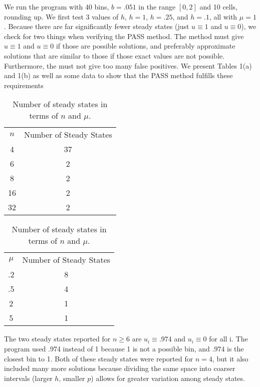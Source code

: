 \documentclass[11pt]{article}
\newcommand{\bhline}{\Xhline{2\arrayrulewidth}}
\begin{document}
We run the program with 40 bins, $b = .051$ in the range $[0,2]$ and 10 cells, rounding up. We first test 3 values of $h$, $h = 1$, $h = .25$, and $h = .1$, all with $\mu = 1$. Because there are far significantly fewer steady states (just $u \equiv 1$ and $u \equiv 0$), we check for two things when verifying the PASS method. The method must give $u \equiv 1$ and $u \equiv 0$ if those are possible solutions, and preferably approximate solutions that are similar to those if those exact values are not possible. Furthermore, the must not give too many false positives. We present Tables 1(a) and 1(b) as well as some data to show that the PASS method fulfills these requirements

\begin{comment}
\footnote{Ok, does it?}.
\end{comment}

\begin{table}
\begin{center}

\begin{tabular}{ | c | c | }
\hline
$n$ & Number of Steady States \\
\bhline
4 & 37 \\
\hline
6 & 2 \\
\hline
8 & 2 \\ 
\hline
16 & 2 \\
\hline
32 & 2 \\
\hline
\end{tabular}
\hspace{.5in}
\begin{tabular}{ | c | c | }
\hline
$\mu$ & Number of Steady States \\
\bhline
.2 & 8 \\
\hline
.5 & 4 \\ 
\hline
2 & 1 \\ %
\hline
5 & 1 \\
\hline
\end{tabular}

\caption{Number of steady states in terms of $n$ and $\mu$.}
\label{Fisher Statistics}
\end{center}
\end{table}

The two steady states reported for $n \ge 6$ are $u_i \equiv .974$ and $u_i \equiv 0$ for all i. The program used .974 instead of 1 because 1 is not a possible bin, and $.974$ is the closest bin to 1. Both of these steady states were reported for $n = 4$, but it also included many more solutions because dividing the same space into coarser intervals (larger $h$, smaller $p$) allows for greater variation among steady states.
\end{document}
